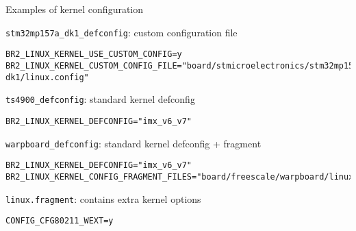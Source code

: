 \begin{frame}[fragile]{Examples of kernel configuration}

  \scriptsize

  \begin{block}{{\tt stm32mp157a\_dk1\_defconfig}: custom configuration file}
\begin{verbatim}
BR2_LINUX_KERNEL_USE_CUSTOM_CONFIG=y
BR2_LINUX_KERNEL_CUSTOM_CONFIG_FILE="board/stmicroelectronics/stm32mp157a-dk1/linux.config"
\end{verbatim}
  \end{block}

  \begin{block}{{\tt ts4900\_defconfig}: standard kernel defconfig}
\begin{verbatim}
BR2_LINUX_KERNEL_DEFCONFIG="imx_v6_v7"
\end{verbatim}
  \end{block}

  \begin{block}{{\tt warpboard\_defconfig}: standard kernel defconfig + fragment}
\begin{verbatim}
BR2_LINUX_KERNEL_DEFCONFIG="imx_v6_v7"
BR2_LINUX_KERNEL_CONFIG_FRAGMENT_FILES="board/freescale/warpboard/linux.fragment"
\end{verbatim}
  \end{block}

  \begin{block}{{\tt linux.fragment}: contains extra kernel options}
\begin{verbatim}
CONFIG_CFG80211_WEXT=y
\end{verbatim}
  \end{block}

\end{frame}


